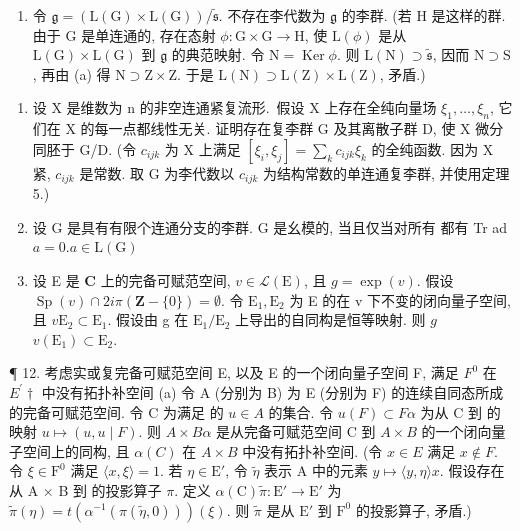 \begin{enumerate}
\def\labelenumi{(\alph{enumi})}
\setcounter{enumi}{1}
\tightlist
\item
  令 \(\mathfrak{g} = (\mathrm{L}(\mathrm{G})\times \mathrm{L}(\mathrm{G})) / \tilde{\mathfrak{s}}\). 不存在李代数为 \(\mathfrak{g}\) 的李群. (若 \(\mathrm{H}\) 是这样的群. 由于 \(\mathrm{G}\) 是单连通的, 存在态射 \(\phi : \mathrm{G}\times \mathrm{G}\to \mathrm{H}\), 使 \(\mathrm{L}(\phi)\) 是从 \(\mathrm{L}(\mathrm{G})\times \mathrm{L}(\mathrm{G})\) 到 \(\mathfrak{g}\) 的典范映射. 令 \(\mathrm{N} = \operatorname{Ker}\phi\). 则 \(\mathrm{L}(\mathrm{N})\supset \tilde{\mathfrak{s}}\), 因而 \(\mathrm{N}\supset \mathrm{S}\), 再由 (a) 得 \(\mathrm{N}\supset \mathrm{Z}\times \mathrm{Z}\). 于是 \(\mathrm{L}(\mathrm{N})\supset \mathrm{L}(\mathrm{Z})\times \mathrm{L}(\mathrm{Z})\), 矛盾.)
\end{enumerate}

\begin{enumerate}
\def\labelenumi{\arabic{enumi}.}
\setcounter{enumi}{8}
\item
  设 X 是维数为 n 的非空连通紧复流形.~假设 X 上存在全纯向量场 \(\xi_{1},\ldots,\xi_{n}\), 它们在 X 的每一点都线性无关. 证明存在复李群 G 及其离散子群 D, 使 X 微分同胚于 G/D. (令 \(c_{ijk}\) 为 X 上满足 \([\xi_{i},\xi_{j}]=\sum_{k}c_{ijk}\xi_{k}\) 的全纯函数. 因为 X 紧, \(c_{ijk}\) 是常数. 取 G 为李代数以 \(c_{ijk}\) 为结构常数的单连通复李群, 并使用定理 5.)
\item
  设 G 是具有有限个连通分支的李群. G 是幺模的, 当且仅当对所有  都有 Tr ad \(a = 0\).\(a \in \mathrm{L}(\mathrm{G})\)
\item
  设 E 是 \(\mathbf{C}\) 上的完备可赋范空间, \(v \in \mathcal{L}(\mathrm{E})\), 且 \(g = \exp(v)\). 假设 \(\operatorname{Sp}(v) \cap 2i\pi(\mathbf{Z} - \{0\}) = \emptyset\). 令 \(\mathrm{E}_1, \mathrm{E}_2\) 为 E 的在 v 下不变的闭向量子空间, 且 \(v\)\(\mathrm{E}_2 \subset \mathrm{E}_1\). 假设由 g 在 \(\mathrm{E}_1 / \mathrm{E}_2\) 上导出的自同构是恒等映射. 则 \(g\)\(v(\mathrm{E}_1) \subset \mathrm{E}_2\).
\end{enumerate}

¶ 12. 考虑实或复完备可赋范空间 E, 以及 E 的一个闭向量子空间 F, 满足 \(F^{0}\) 在 \(E^{\prime}\dagger\) 中没有拓扑补空间 (a) 令 A (分别为 B) 为 E (分别为 F) 的连续自同态所成的完备可赋范空间. 令 C 为满足  的 \(u \in A\) 的集合. 令 \(u(F) \subset F\)\(\alpha\) 为从 C 到  的映射 \(u \mapsto (u, u \mid F)\). 则 \(A \times B\)\(\alpha\) 是从完备可赋范空间 C 到 \(A \times B\) 的一个闭向量子空间上的同构, 且 \(\alpha(C)\) 在 \(A \times B\) 中没有拓扑补空间. (令 \(x \in E\) 满足 \(x \notin F\). 令 \(\xi \in \mathrm{F}^0\) 满足 \(\langle x, \xi \rangle = 1\). 若 \(\eta \in \mathrm{E}'\), 令 \(\tilde{\eta}\) 表示 A 中的元素 \(y \mapsto \langle y, \eta \rangle x\). 假设存在从 A × B 到  的投影算子 \(\pi\). 定义 \(\alpha(\mathrm{C})\)\(\tilde{\pi} \colon \mathrm{E}' \to \mathrm{E}'\) 为 \(\tilde{\pi}(\eta) = t(\alpha^{-1}(\pi(\tilde{\eta}, 0)))(\xi)\). 则 \(\tilde{\pi}\) 是从 \(\mathrm{E}'\) 到 \(\mathrm{F}^0\) 的投影算子, 矛盾.)


